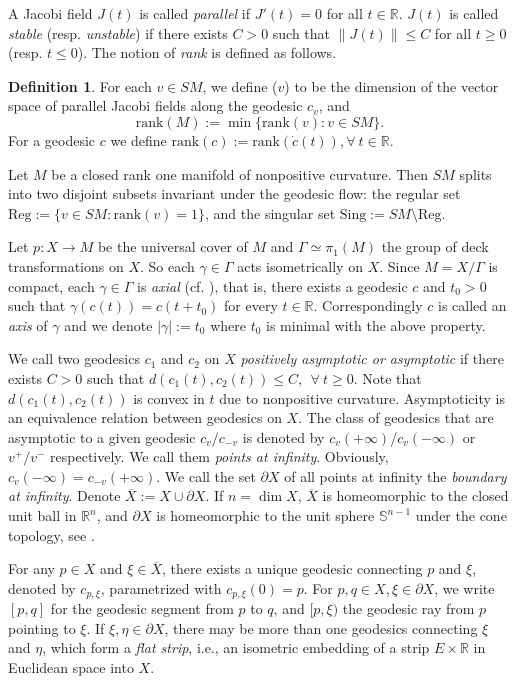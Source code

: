 \documentclass[11pt]{amsart}
\theoremstyle{definition}
\newtheorem{definition}[theorem]{Definition}
\def\pX{{\partial X}}
\def\RR{{\mathbb R}}
\def\c{\gamma}   \def\C{\Gamma}
\begin{document}
A Jacobi field $J(t)$ is called \emph{parallel} if $J'(t)=0$ for all $t\in \RR$. $J(t)$ is called \emph{stable} (resp. \emph{unstable}) if there exists $C>0$ such that $\|J(t)\|\le C$ for all $t\ge 0$ (resp. $t\le 0$). The notion of \emph{rank} is defined as follows.
\begin{definition}
For each $v \in SM$, we define ($v$) to be the dimension of the vector space of parallel Jacobi fields along the geodesic $c_{v}$, and 
\[\text{rank}(M):=\min\{\text{rank}(v): v \in SM\}.\] 
For a geodesic $c$ we define $\text{rank}(c):=\text{rank}(\dot c(t)), \forall\ t\in \mathbb{R}.$
\end{definition}
Let $M$ be a closed rank one manifold of nonpositive curvature. Then $SM$ splits into two disjoint subsets invariant under the geodesic flow: the regular set $\text{Reg}:= \{v\in SM: \text{rank}(v)=1\}$, and the singular set $\text{Sing}:= SM \setminus \text{Reg}$. 

Let $p: X\to M$ be the universal cover of $M$ and $\C \simeq \pi_1(M)$ the group of deck transformations on $X$. So each $\c\in \C$ acts isometrically on $X$. Since $M=X/\Gamma$ is compact, each $\c\in \Gamma$ is \emph{axial} (cf. \cite[Lemma 2.1]{CS}), that is, there exists a geodesic $c$ and $t_{0}>0$ such that $\c(c(t)) = c(t+t_{0})$ for every $t\in \mathbb{R}$. Correspondingly $c$ is called an \emph{axis} of $\c$ and we denote $|\c|:=t_0$ where $t_0$ is minimal with the above property.  

We call two geodesics $c_{1}$ and $c_{2}$ on $X$ \emph{positively asymptotic or asymptotic} if there exists $C > 0$ such that $d(c_{1}(t),c_{2}(t)) \leq C, ~~\forall~ t \geq 0.$ Note that $d(c_{1}(t),c_{2}(t))$ is convex in $t$ due to nonpositive curvature. Asymptoticity is an equivalence relation between geodesics on $X$. The class of geodesics that are asymptotic to a given geodesic $c_v/c_{-v}$ is denoted by $c_v(+\infty)$/$c_v(-\infty)$ or $v^+/v^-$ respectively. We call them \emph{points at infinity}. Obviously, $c_{v}(-\infty)=c_{-v}(+\infty)$. We call the set $\partial X$ of all points at infinity the \emph{boundary at infinity}.
Denote $\overline X:=X\cup \pX$. If $n=\dim X$, $\overline{X}$ is homeomorphic to the closed unit ball in $\mathbb{R}^n$, and $\pX$ is homeomorphic to the unit sphere $\mathbb{S}^{n-1}$ under the cone topology, see \cite{EO}.

For any $p\in X$ and $\xi\in \overline{X}$, there exists a unique geodesic connecting $p$ and $\xi$, denoted by $c_{p,\xi}$, parametrized with $c_{p,\xi}(0)=p$. For $p,q\in X, \xi\in \pX$, we write $[p,q]$ for the geodesic segment from $p$ to $q$, and $[p,\xi)$ the geodesic ray from $p$ pointing to $\xi$. If $\xi,\eta\in \pX$, there may be more than one geodesics connecting $\xi$ and $\eta$, which form  a \emph{flat strip}, i.e., an isometric embedding of a strip $E\times \RR$ in Euclidean space into $X$.
\end{document}
